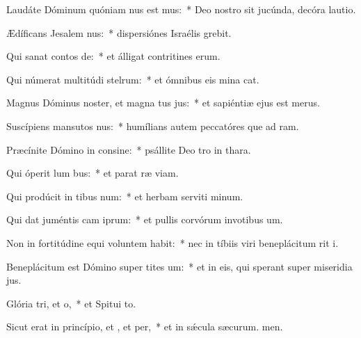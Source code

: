 \item Laudáte Dóminum quóniam nus est mus:~* Deo nostro sit jucúnda, decóra lautio.
\item Ædíficans Jesalem nus:~* dispersiónes Israélis grebit.
\item Qui sanat contos de:~* et álligat contritines erum.
\item Qui númerat multitúdi stelrum:~* et ómnibus eis mina cat.
\item Magnus Dóminus noster, et magna tus jus:~* et sapiéntiæ ejus  est merus.
\item Suscípiens mansutos nus:~* humílians autem peccatóres que ad ram.
\item Præcínite Dómino in consine:~* psállite Deo tro in thara.
\item Qui óperit lum bus:~* et parat ræ viam.
\item Qui prodúcit in tibus num:~* et herbam serviti minum.
\item Qui dat juméntis cam iprum:~* et pullis corvórum invotibus um.
\item Non in fortitúdine equi voluntem habit:~* nec in tíbiis viri beneplácitum rit i.
\item Beneplácitum est Dómino super tites um:~* et in eis, qui sperant super miseridia jus.
\item Glória tri, et o,~* et Spitui to.
\item Sicut erat in princípio, et , et per,~* et in sǽcula sæcurum. men.
